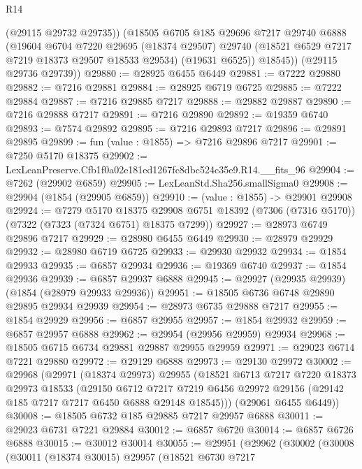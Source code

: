 \begin{lexlean}{R14}
\begin{coremodule}
          (@29115 @29732 @29735))
        (@18505
          @6705
          @185
          @29696
          @7217
          @29740
          @6888
          (@19604
            @6704
            @7220
            @29695
            (@18374 @29507)
            @29740
            (@18521 @6529 @7217 @7219 @18373 @29507 @18533 @29534)
            (@19631 @6525))
          @18545))
      (@29115 @29736 @29739))
@29880 := @28925 @6455 @6449
@29881 := @7222 @29880
@29882 := @7216 @29881
@29884 := @28925 @6719 @6725
@29885 := @7222 @29884
@29887 := @7216 @29885 @7217
@29888 := @29882 @29887
@29890 := @7216 @29888 @7217
@29891 := @7216 @29890
@29892 := @19359 @6740
@29893 := @7574 @29892
@29895 := @7216 @29893 @7217
@29896 := @29891 @29895
@29899 := fun (value : @1855) => @7216 @29896 @7217
@29901 := @7250 @5170 @18375
@29902 := LexLeanPreserve.Cfb1f0a02e181ed1267fc8dbc524c35e9.R14.__fits_96
@29904 := @7262 (@29902 @6859)
@29905 := LexLeanStd.Sha256.smallSigma0
@29908 := @29904 (@1854 (@29905 @6859))
@29910 := (value : @1855) -> @29901 @29908
@29924 := @7279
    @5170
    @18375
    @29908
    @6751
    @18392
    (@7306 (@7316 @5170))
    (@7322 (@7323 (@7324 @6751) @18375 @7299))
@29927 := @28973 @6749 @29896 @7217
@29929 := @28980 @6455 @6449
@29930 := @28979 @29929
@29932 := @28980 @6719 @6725
@29933 := @29930 @29932
@29934 := @1854 @29933
@29935 := @6857 @29934
@29936 := @19369 @6740
@29937 := @1854 @29936
@29939 := @6857 @29937 @6888
@29945 := @29927 (@29935 @29939) (@1854 (@28979 @29933 @29936))
@29951 := @18505 @6736 @6748 @29890 @29895 @29934 @29939
@29954 := @28973 @6735 @29888 @7217
@29955 := @1854 @29929
@29956 := @6857 @29955
@29957 := @1854 @29932
@29959 := @6857 @29957 @6888
@29962 := @29954 (@29956 @29959) @29934
@29968 := @18505 @6715 @6734 @29881 @29887 @29955 @29959
@29971 := @29023 @6714 @7221 @29880
@29972 := @29129 @6888
@29973 := @29130 @29972
@30002 := @29968
    (@29971
      (@18374 @29973)
      @29955
      (@18521
        @6713
        @7217
        @7220
        @18373
        @29973
        @18533
        (@29150
          @6712
          @7217
          @7219
          @6456
          @29972
          @29156
          (@29142 @185 @7217 @7217 @6450 @6888 @29148 @18545)))
      (@29061 @6455 @6449))
@30008 := @18505 @6732 @185 @29885 @7217 @29957 @6888
@30011 := @29023 @6731 @7221 @29884
@30012 := @6857 @6720
@30014 := @6857 @6726 @6888
@30015 := @30012 @30014
@30055 := @29951
    (@29962
      (@30002
        (@30008
          (@30011
            (@18374 @30015)
            @29957
            (@18521
              @6730
              @7217

\end{coremodule}
\end{lexlean}
